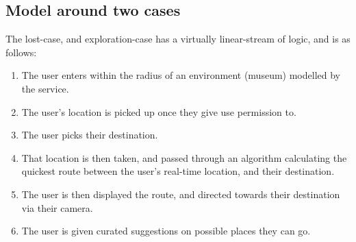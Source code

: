 \subsection*{Model around two cases}
The lost-case, and exploration-case has a virtually linear-stream of logic, and is as follows:

\begin{enumerate}
    \item The user enters within the radius of an environment (museum) modelled by the service.
    \item The user’s location is picked up once they give use permission to.
    \item The user picks their destination.
    \item That location is then taken, and passed through an algorithm calculating the quickest route between the user’s real-time location, and their destination.
    \item The user is then displayed the route, and directed towards their destination via their camera.
    \item The user is given curated suggestions on possible places they can go.
\end{enumerate}